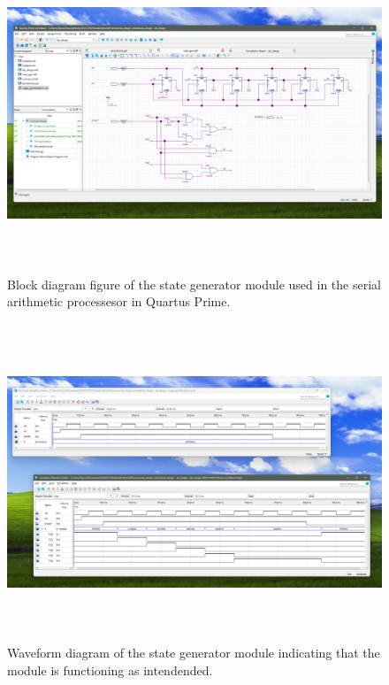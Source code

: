 \documentclass[11pt,a4paper,english]{article}
\begin{document}
   \begin{figure}[h!]
    \centering
    \includegraphics*[height=95mm]{./ss/StageGenBDF.png}
    \caption{Block diagram figure of the state generator module used in the serial arithmetic processesor in Quartus Prime.}
    \label{figure}
   \end{figure}

   \begin{figure}[h!]
    \centering
    \includegraphics[height=95mm]{./ss/StageGenWaveform.png}
    \caption{Waveform diagram of the state generator module indicating that the module is functioning as intendended.}
    \label{figure}
   \end{figure}
\end{document}
